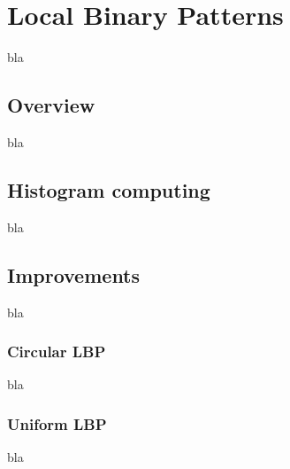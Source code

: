 \chapter{Local Binary Patterns}
\label{chap:lbp}

\noindent bla

\section{Overview}

\noindent bla
\newline

\section{Histogram computing}

\noindent bla
\newline

\section{Improvements}

\noindent bla
\newline

\subsection{Circular LBP}

\vspace{\baselineskip}
\noindent bla
\newline

\subsection{Uniform LBP}

\vspace{\baselineskip}
\noindent bla
\newline